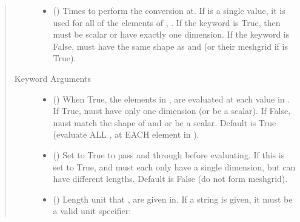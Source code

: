 \documentclass[letterpaper,10pt,english]{sphinxmanual}
\begin{document}
\begin{fulllineitems}
\begin{fulllineitems}
\begin{quote}
\begin{description}
\begin{itemize}
\item {} 
 () \textendash{} Times to perform the conversion at.
If  is a single value, it is used for all of the elements of
, . If the  keyword is True, then  must be
scalar or have exactly one dimension. If the  keyword is
False,  must have the same shape as  and  (or their
meshgrid if  is True).

\end{itemize}

\item[{Keyword Arguments}] \leavevmode\begin{itemize}
\item {} 
 () \textendash{} When True, the elements in ,  are evaluated
at each value in . If True,  must have only one dimension
(or be a scalar). If False,  must match the shape of  and
 or be a scalar. Default is True (evaluate ALL ,  at
EACH element in ).

\item {} 
 () \textendash{} Set to True to pass  and  through
 before evaluating. If this is set to
True,  and  must each only have a single dimension, but
can have different lengths. Default is False (do not form
meshgrid).

\item {} 
 () \textendash{} 
Length unit that ,  are given in.
If a string is given, it must be a valid unit specifier:
\begin{quote}



\end{quote}
\end{itemize}
\end{description}
\end{quote}
\end{fulllineitems}
\end{fulllineitems}
\end{document}
